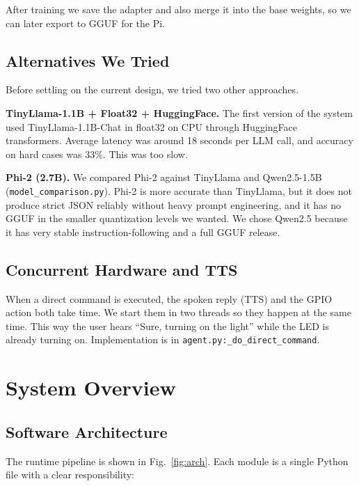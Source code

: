 \documentclass[conference]{IEEEtran}
\begin{document}
After training we save the adapter and also merge it into the base weights, so we can later export to GGUF for the Pi.

\subsection{Alternatives We Tried}

Before settling on the current design, we tried two other approaches.

\textbf{TinyLlama-1.1B + Float32 + HuggingFace.} The first version of the system used TinyLlama-1.1B-Chat in float32 on CPU through HuggingFace transformers. Average latency was around 18 seconds per LLM call, and accuracy on hard cases was 33\%. This was too slow.

\textbf{Phi-2 (2.7B).} We compared Phi-2 against TinyLlama and Qwen2.5-1.5B (\texttt{model\_comparison.py}). Phi-2 is more accurate than TinyLlama, but it does not produce strict JSON reliably without heavy prompt engineering, and it has no GGUF in the smaller quantization levels we wanted. We chose Qwen2.5 because it has very stable instruction-following and a full GGUF release.

\subsection{Concurrent Hardware and TTS}

When a direct command is executed, the spoken reply (TTS) and the GPIO action both take time. We start them in two threads so they happen at the same time. This way the user hears ``Sure, turning on the light'' while the LED is already turning on. Implementation is in \texttt{agent.py:\_do\_direct\_command}.

\section{System Overview}
\label{sec:system}

\subsection{Software Architecture}

The runtime pipeline is shown in Fig.~\ref{fig:arch}. Each module is a single Python file with a clear responsibility:
\end{document}
